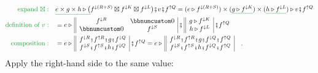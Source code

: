 \begin{align*}
{\color{greenunder}\text{expand }\boxtimes:}\quad & \gunderline{e\times g\times h\triangleright\big(}f^{\downarrow(R+S)}\boxtimes f^{\downarrow K}\boxtimes f^{\downarrow L}\big)\bef v\bef f^{\uparrow Q}=(e\triangleright f^{\downarrow(R+S)})\times(\gunderline{g\triangleright f^{\downarrow K}})\times(\gunderline{h\triangleright f^{\downarrow L}})\triangleright v\bef f^{\uparrow Q}\\
{\color{greenunder}\text{definition of }v:}\quad & =e\triangleright\,\begin{array}{||cc|}
f^{\downarrow R} & \bbnum 0\\
\bbnum 0 & f^{\downarrow S}
\end{array}\,\bef\,\begin{array}{||c|}
g\triangleright f^{\downarrow K}\\
h\triangleright f^{\downarrow L}
\end{array}\,\bef f^{\uparrow Q}\\
{\color{greenunder}\text{composition}:}\quad & =e\triangleright\,\begin{array}{||c|}
f^{\downarrow R}\bef f^{\uparrow R}\bef g\bef f^{\downarrow Q}\\
f^{\downarrow S}\bef f^{\uparrow S}\bef h\bef f^{\downarrow Q}
\end{array}\,\bef f^{\uparrow Q}=e\triangleright\,\begin{array}{||c|}
f^{\downarrow R}\bef f^{\uparrow R}\bef g\bef f^{\downarrow Q}\bef f^{\uparrow Q}\\
f^{\downarrow S}\bef f^{\uparrow S}\bef h\bef f^{\downarrow Q}\bef f^{\uparrow Q}
\end{array}\quad.
\end{align*}
Apply the right-hand side to the same value:
